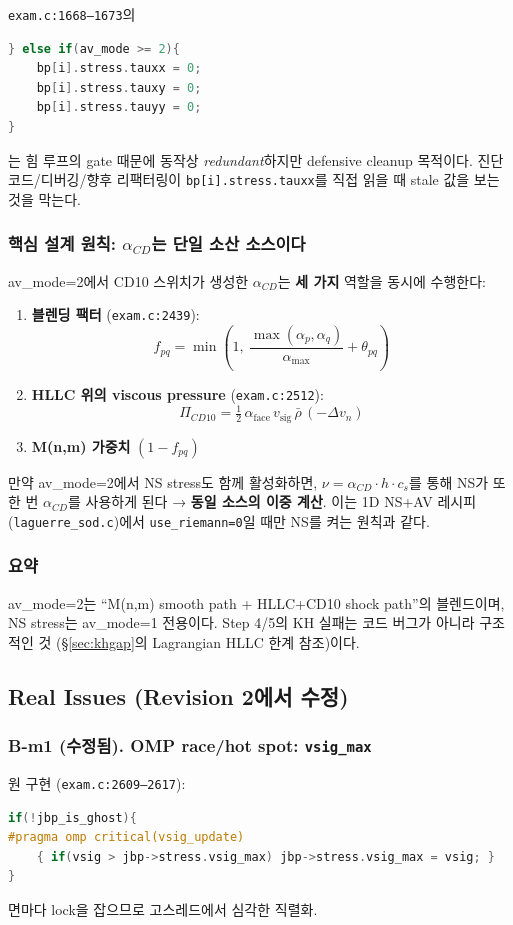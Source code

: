 \documentclass[11pt]{article}
\begin{document}
\texttt{exam.c:1668--1673}의
\begin{lstlisting}[language=C]
} else if(av_mode >= 2){
    bp[i].stress.tauxx = 0;
    bp[i].stress.tauxy = 0;
    bp[i].stress.tauyy = 0;
}
\end{lstlisting}
는 힘 루프의 gate 때문에 동작상 \emph{redundant}하지만 defensive cleanup 목적이다.
진단 코드/디버깅/향후 리팩터링이 \texttt{bp[i].stress.tauxx}를 직접 읽을 때
stale 값을 보는 것을 막는다.

\subsubsection*{핵심 설계 원칙: $\alpha_{CD}$는 단일 소산 소스이다}

av\_mode=2에서 CD10 스위치가 생성한 $\alpha_{CD}$는 \textbf{세 가지} 역할을
동시에 수행한다:
\begin{enumerate}
  \item \textbf{블렌딩 팩터} (\texttt{exam.c:2439}):
    \[ f_{pq} = \min\!\left(1,\ \frac{\max(\alpha_p,\alpha_q)}{\alpha_{\max}} + \theta_{pq}\right) \]
  \item \textbf{HLLC 위의 viscous pressure} (\texttt{exam.c:2512}):
    \[ \Pi_{CD10} = \tfrac{1}{2}\,\alpha_\mathrm{face}\, v_\mathrm{sig}\, \bar\rho\, (-\Delta v_n) \]
  \item \textbf{M(n,m) 가중치} $(1-f_{pq})$
\end{enumerate}

만약 av\_mode=2에서 NS stress도 함께 활성화하면, $\nu = \alpha_{CD}\cdot h\cdot c_s$를
통해 NS가 또 한 번 $\alpha_{CD}$를 사용하게 된다 → \textbf{동일 소스의 이중 계산}.
이는 1D NS+AV 레시피 (\texttt{laguerre\_sod.c})에서 \texttt{use\_riemann=0}일 때만
NS를 켜는 원칙과 같다.

\subsubsection*{요약}
av\_mode=2는 ``M(n,m) smooth path + HLLC+CD10 shock path''의 블렌드이며,
NS stress는 av\_mode=1 전용이다. Step 4/5의 KH 실패는 코드 버그가 아니라
구조적인 것 (\S\ref{sec:khgap}의 Lagrangian HLLC 한계 참조)이다.

\subsection{Real Issues (Revision 2에서 수정)}

\subsubsection*{B-m1 (수정됨). OMP race/hot spot: \texttt{vsig\_max}}
원 구현 (\texttt{exam.c:2609--2617}):
\begin{lstlisting}[language=C]
if(!jbp_is_ghost){
#pragma omp critical(vsig_update)
    { if(vsig > jbp->stress.vsig_max) jbp->stress.vsig_max = vsig; }
}
\end{lstlisting}
면마다 lock을 잡으므로 고스레드에서 심각한 직렬화.
\end{document}

